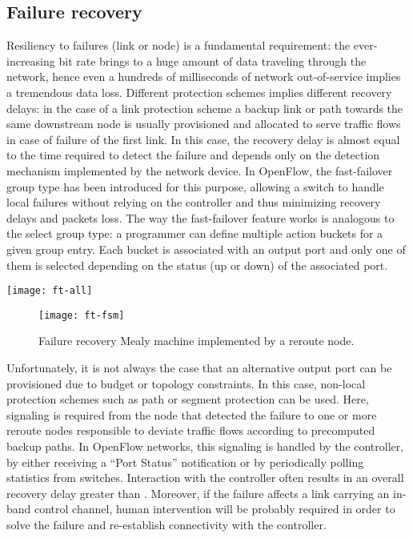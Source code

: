 \documentclass[10pt,conference]{IEEEtran}
\begin{document}
\subsection{Failure recovery}
\label{sec:ft}

Resiliency to failures (link or node) is a fundamental requirement: the ever-increasing bit rate brings to a huge amount of data traveling through the network, hence even a hundreds of milliseconds of network out-of-service implies a tremendous data loss. Different protection schemes implies different recovery delays: in the case of a link protection scheme a backup link or path towards the same downstream node is usually provisioned and allocated to serve traffic flows in case of failure of the first link. In this case, the recovery delay is almost equal to the time required to detect the failure and depends only on the detection mechanism implemented by the network device. In OpenFlow, the fast-failover group type has been introduced for this purpose, allowing a switch to handle local failures without relying on the controller and thus minimizing recovery delays and packets loss. The way the fast-failover feature works is analogous to the select group type: a programmer can define multiple action buckets for a given group entry. Each bucket is associated with an output port and only one of them is selected depending on the status (up or down) of the associated port.

\begin{figure*}
  \centering
  \texttt{[image: ft-all]}
  \caption{Failure recovery example with OpenState. The behavioral model of node 2 is shown in Fig.~\ref{fig:ft-fsm}.}
  \label{fig:ft-example}
\end{figure*}

\begin{figure}[b]
  \centering
  \texttt{[image: ft-fsm]}
  \caption{Failure recovery Mealy machine implemented by a reroute node.}
  \label{fig:ft-fsm}
\end{figure}

Unfortunately, it is not always the case that an alternative output port can be provisioned due to budget or topology constraints. In this case, non-local protection schemes such as path or segment protection can be used. Here, signaling is required from the node that detected the failure to one or more reroute nodes responsible to deviate traffic flows according to precomputed backup paths. In OpenFlow networks, this signaling is handled by the controller, by either receiving a ``Port Status'' notification or by periodically polling statistics from switches. Interaction with the controller often results in an overall recovery delay greater than  \cite{staessens11}. Moreover, if the failure affects a link carrying an in-band control channel, human intervention will be probably required in order to solve the failure and re-establish connectivity with the controller.
\end{document}

